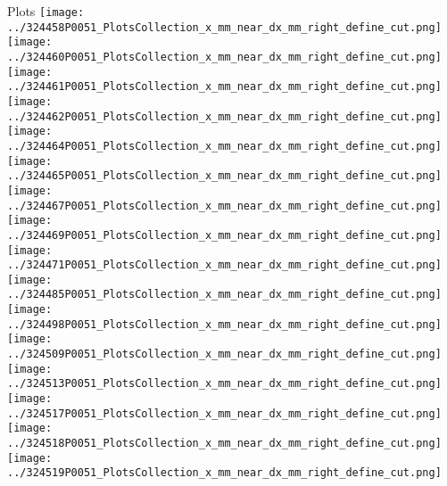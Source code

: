 \documentclass{beamer}
\begin{document}
\begin{frame}\tiny
        \begin{block}{Plots}
		  \centering
                \texttt{[image: ../324458P0051\_PlotsCollection\_x\_mm\_near\_dx\_mm\_right\_define\_cut.png]}
                \texttt{[image: ../324460P0051\_PlotsCollection\_x\_mm\_near\_dx\_mm\_right\_define\_cut.png]}
                \texttt{[image: ../324461P0051\_PlotsCollection\_x\_mm\_near\_dx\_mm\_right\_define\_cut.png]}
                \texttt{[image: ../324462P0051\_PlotsCollection\_x\_mm\_near\_dx\_mm\_right\_define\_cut.png]}
                \texttt{[image: ../324464P0051\_PlotsCollection\_x\_mm\_near\_dx\_mm\_right\_define\_cut.png]}\\
                \texttt{[image: ../324465P0051\_PlotsCollection\_x\_mm\_near\_dx\_mm\_right\_define\_cut.png]}
                \texttt{[image: ../324467P0051\_PlotsCollection\_x\_mm\_near\_dx\_mm\_right\_define\_cut.png]}
                \texttt{[image: ../324469P0051\_PlotsCollection\_x\_mm\_near\_dx\_mm\_right\_define\_cut.png]}
                \texttt{[image: ../324471P0051\_PlotsCollection\_x\_mm\_near\_dx\_mm\_right\_define\_cut.png]}
                \texttt{[image: ../324485P0051\_PlotsCollection\_x\_mm\_near\_dx\_mm\_right\_define\_cut.png]}\\
                \texttt{[image: ../324498P0051\_PlotsCollection\_x\_mm\_near\_dx\_mm\_right\_define\_cut.png]}
                \texttt{[image: ../324509P0051\_PlotsCollection\_x\_mm\_near\_dx\_mm\_right\_define\_cut.png]}
                \texttt{[image: ../324513P0051\_PlotsCollection\_x\_mm\_near\_dx\_mm\_right\_define\_cut.png]}
                \texttt{[image: ../324517P0051\_PlotsCollection\_x\_mm\_near\_dx\_mm\_right\_define\_cut.png]}
                \texttt{[image: ../324518P0051\_PlotsCollection\_x\_mm\_near\_dx\_mm\_right\_define\_cut.png]}\\
                \texttt{[image: ../324519P0051\_PlotsCollection\_x\_mm\_near\_dx\_mm\_right\_define\_cut.png]}

\end{block}
\end{frame}
\end{document}
